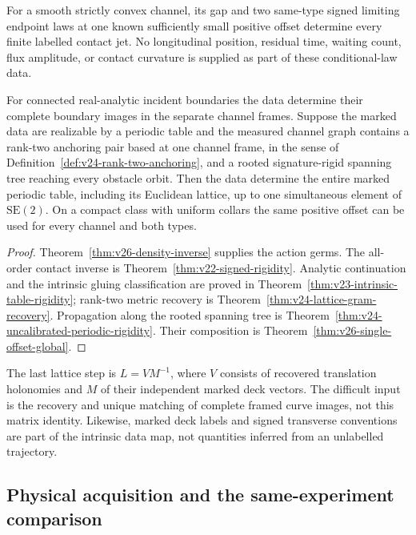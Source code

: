 \begin{theorem}
\label{thm:v26-intro-rigidity}
\label{thm:v25-intro-rigidity}
For a smooth strictly convex channel, its gap and two same-type signed
limiting endpoint laws at one known sufficiently small positive offset
 determine every finite labelled contact jet.  No longitudinal position,
residual time, waiting count, flux amplitude, or contact curvature is
supplied as part of these conditional-law data.

For connected real-analytic incident boundaries the data determine their
complete boundary images in the separate channel frames.  Suppose the
marked data are realizable by a periodic table and the measured channel
graph contains a rank-two anchoring pair based at one channel frame,
in the sense of Definition~\ref{def:v24-rank-two-anchoring}, and a rooted
signature-rigid spanning tree reaching every obstacle orbit.  Then the
data determine the entire marked periodic table,
including its Euclidean lattice, up to one simultaneous element of
\(\mathrm{SE}(2)\).  On a compact class with uniform collars the same
positive offset can be used for every channel and both types.
\end{theorem}

\begin{proof}
Theorem~\ref{thm:v26-density-inverse} supplies the action germs.  The
all-order contact inverse is Theorem~\ref{thm:v22-signed-rigidity}.
Analytic continuation and the intrinsic gluing classification are proved
in Theorem~\ref{thm:v23-intrinsic-table-rigidity}; rank-two metric recovery
is Theorem~\ref{thm:v24-lattice-gram-recovery}.  Propagation along the
rooted spanning tree is Theorem~\ref{thm:v24-uncalibrated-periodic-rigidity}.
Their composition is
Theorem~\ref{thm:v26-single-offset-global}.
\end{proof}

The last lattice step is \(L=VM^{-1}\), where \(V\) consists of recovered
translation holonomies and \(M\) of their independent marked deck
vectors.  The difficult input is the recovery and unique matching of
complete framed curve images, not this matrix identity.  Likewise, marked
deck labels and signed transverse conventions are part of the intrinsic
data map, not quantities inferred from an unlabelled trajectory.

\subsection{Physical acquisition and the same-experiment comparison}

